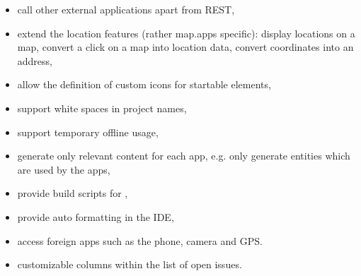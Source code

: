 \begin{itemize}
\item call other external applications apart from REST,
\item extend the location features (rather map.apps specific):
\subitem display locations on a map,
\subitem convert a click on a map into location data,
\subitem convert coordinates into an address,
\item allow the definition of custom icons for startable elements,
\item support white spaces in project names,
\item support temporary offline usage,
\item generate only relevant content for each app, e.g. only generate entities which are used by the apps,
\item provide build scripts for \MD,
\item provide auto formatting in the IDE,
\item access foreign apps such as the phone, camera and GPS.
\item customizable columns within the list of open issues.
\end{itemize}


